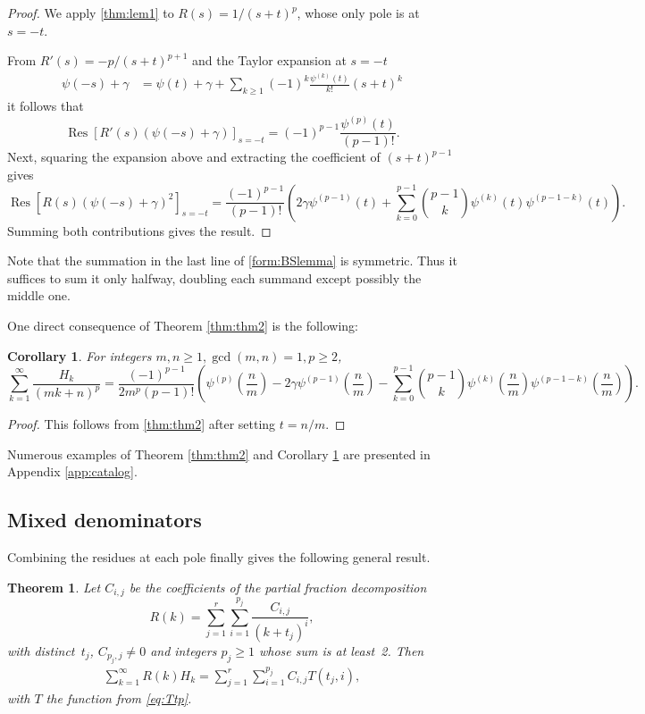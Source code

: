 \documentclass{article}
\newtheorem{theorem}{Theorem}
\newtheorem{corollary}{Corollary}
\theoremstyle{definition}
\begin{document}
\begin{proof}
We apply \cref{thm:lem1} to $R(s) = 1 / (s + t)^p$, whose only pole
is at~$s=-t$. 

From $R'(s)=-p/(s+t)^{p+1}$ and the Taylor expansion at $s=-t$
\begin{align}
\psi(-s)+\gamma &= \psi(t) + \gamma + \sum_{k\ge1}{(-1)^k
\frac{\psi^{(k)}(t)}{k!}(s+t)^k} \label{form:res1}
\end{align}
it follows that
\[\operatorname{Res}[R'(s)(\psi(-s)+\gamma)]_{s=-t}=(-1)^
{p-1}\frac{\psi^{(p)}(t)}{(p-1)!}.\]
Next, squaring the expansion above and extracting the coefficient
of $(s+t)^{p-1}$ gives
\[\operatorname{Res}[R(s)(\psi(-s)+\gamma)^2]_{s=-t}=\frac{(-1)^{p-1}}{
(p-1)!}\left(
2\gamma\psi^{(p-1)}(t)+\sum_
{k=0}^{p-1} \binom{p-1}{k}\psi^{(k)}(t)\psi^{(p-1-k)}(t)\right)
.\]
Summing both contributions gives the result.
\end{proof}

Note that the summation in the last line of \cref{form:BSlemma} is symmetric. Thus it suffices to sum it only halfway, doubling each summand except possibly the middle one.

One direct consequence of Theorem \ref{thm:thm2} is the following:
\begin{corollary} \label{cor:cor1}
For integers $m, n \geq 1, \gcd (m, n) = 1, p \geq 2$,
\begin{equation}\label{form:theorem3}
\sum_{k=1}^\infty \frac{H_k}{(mk + n)^p}=
\frac{(-1)^{p-1}}{2m^p(p-1)!}\left(\psi^{(p)}\left(\frac nm\right)
-2\gamma\psi^{(p-1)}\left(\frac nm\right)-\sum_
{k=0}^{p-1} \binom{p-1}{k}\psi^{(k)}\left(\frac nm\right)\psi^{(p-1-k)}\left(\frac nm\right)
\right).
\end{equation}
\end{corollary}
\begin{proof}
This follows from \cref{thm:thm2} after setting $t = n/m$.
\end{proof}
Numerous examples of Theorem \ref{thm:thm2} and Corollary \ref{cor:cor1} are presented in Appendix \ref{app:catalog}.

\subsection{Mixed denominators}
Combining the residues at each pole finally gives the following general result.
\begin{theorem} \label{thm:thm3}
Let $C_{i,j}$ be the coefficients of the partial fraction decomposition
\begin{equation}
R(k) = \sum_{j=1}^r\sum_{i=1}^{p_j}\frac{C_{i,j}}{(k+t_j)^i},
\end{equation}
with distinct~$t_j$, $C_{p_j,j}\neq0$ and integers $p_j \geq
1$ whose sum is at least~2. Then
\begin{align}
\sum_{k=1}^\infty R(k){H_k}=\sum_{j=1}^r\sum_{i=1}^{p_j}C_{i,j}T(t_j,i),
\label{form:theorem4a}
\end{align}
with $T$ the function from \cref{eq:Ttp}.
\end{theorem}
\end{document}
